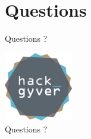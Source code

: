 \documentclass{beamer}
\begin{document}
\section{Questions}

\begin{frame}{Questions ?}
	\begin{center}
		\includegraphics[height=3cm,width=3cm]{images/LogoHackGyver.png} \\
		\Huge{Questions ?}
	\end{center}
\end{frame}
\end{document}
